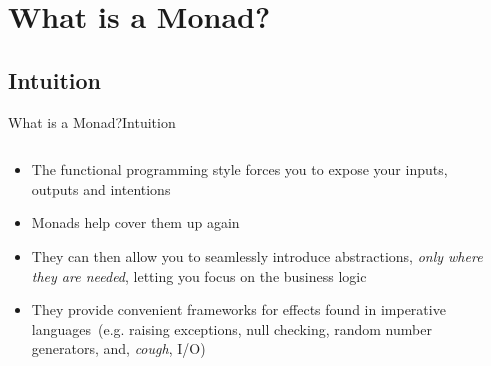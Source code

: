 \documentclass{beamer}
\begin{document}
  \section{What is a Monad?}
  \subsection{Intuition}
  \begin{frame}[fragile]{What is a Monad?}{Intuition}
    \begin{columns}[t]
      \begin{column}{.9\textwidth}
        \begin{itemize}
          \item The functional programming style forces you to expose your inputs, outputs and intentions
          \item Monads help cover them up again
          \item They can then allow you to seamlessly introduce abstractions,
            \textit{only where they are needed}, letting you focus on the business logic
          \item They provide convenient frameworks for effects found in imperative languages\,\footnotemark
            (e.g. raising exceptions,
            null checking,
            random number generators,
            and, \textit{cough}, I/O)
        \end{itemize}
      \end{column}
      \begin{column}{.1\textwidth}
      \end{column}
    \end{columns}
  \end{frame}
\end{document}
